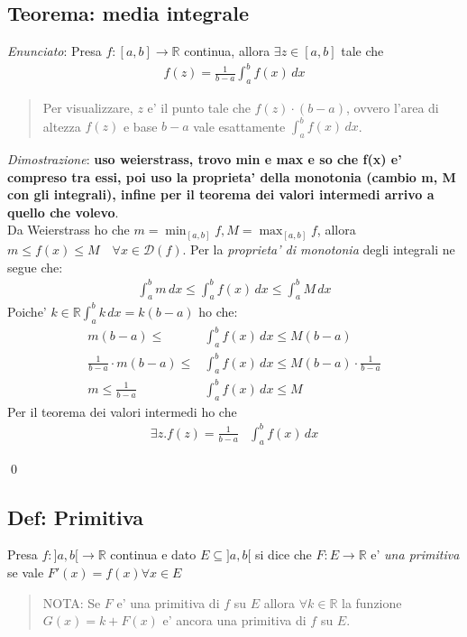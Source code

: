\documentclass{article}
\begin{document}
\subsection{Teorema: media integrale}

\emph{Enunciato}: Presa $f: [a, b] \to \mathbb{R}$ continua, allora $\exists z \in [a, b]$ tale che
\begin{align*}
  f(z) = \frac{1}{b-a} \int_a^b f(x) \, dx
\end{align*}
\begin{quote}
  Per visualizzare, $z$ e' il punto tale che $f(z) \cdot (b-a)$, ovvero
  l'area di altezza $f(z)$ e base $b-a$ vale esattamente $\int_a^b f(x) \, dx$.
\end{quote}
\emph{Dimostrazione}: \textbf{uso weierstrass, trovo min e max e so che f(x) e'
compreso tra essi, poi uso la proprieta' della monotonia (cambio m, M con gli integrali),
infine per il teorema dei valori intermedi arrivo a quello che volevo}. \\
Da Weierstrass ho che $m = \min_{[a, b]} f, M = \max_{[a, b]} f$, allora $m \leq f(x) \leq M \quad
\forall x \in \mathcal{D}(f)$. Per la \emph{proprieta' di monotonia} degli
integrali ne segue che:
\begin{align*}
  \int_a^b m \, dx \leq \int_a^b f(x) \, dx \leq \int_a^b M \, dx
\end{align*}
Poiche' $k \in \mathbb{R} \int_a^b k \, dx = k(b - a)$ ho che:
\begin{align*}
  m(b-a) \leq &\int_a^b f(x) \, dx \leq M(b-a) \\
  \frac{1}{b-a} \cdot m(b-a) \leq &\int_a^b f(x) \, dx \leq M(b-a) \cdot \frac{1}{b-a} \\
  m \leq \frac{1}{b-a} &\int_a^b f(x) \, dx \leq M
\end{align*}
Per il teorema dei valori intermedi ho che 
\begin{align*}
  \exists z. f(z) = \frac{1}{b-a} &\int_a^b f(x) \, dx
\end{align*}

\qed

\subsection{Def: Primitiva}

Presa $f: ]a,b[ \to \mathbb{R}$ continua e dato $E \subseteq ]a, b[$ si dice che
$F: E \to \mathbb{R}$ e' \emph{una primitiva} se vale $F'(x)=f(x) \forall x \in E$

\begin{quote}
  NOTA: Se $F$ e' una primitiva di $f$ su $E$ allora $\forall k \in \mathbb{R}$
  la funzione $G(x) = k + F(x)$ e' ancora una primitiva di $f$ su $E$.
\end{quote}
\end{document}
